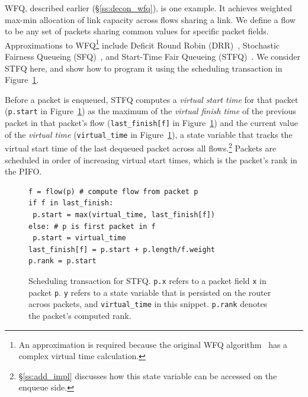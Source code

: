 WFQ, described earlier (\S\ref{ss:decon_wfq}), is one example. It achieves
weighted max-min allocation of link capacity across flows sharing a link. We
define a flow to be any set of packets sharing common values for specific
packet fields.  Approximations to WFQ\footnote{An approximation is required
because the original WFQ algorithm~\cite{wfq} has a complex virtual time
calculation.} include Deficit Round Robin (DRR)~\cite{drr}, Stochastic Fairness
Queueing (SFQ)~\cite{sfq}, and Start-Time Fair Queueing (STFQ)~\cite{stfq}. We
consider STFQ here, and show how to program it using the scheduling transaction
in Figure~\ref{fig:sched_trans}.

Before a packet is enqueued, STFQ computes a {\em virtual start time} for that
packet (\texttt{p.start} in Figure~\ref{fig:sched_trans}) as the maximum of the
{\em virtual finish time} of the previous packet in that packet's flow
(\texttt{last\_finish[f]} in Figure~\ref{fig:sched_trans}) and the current
value of the {\em virtual time} (\texttt{virtual\_time} in
Figure~\ref{fig:sched_trans}), a state variable that tracks the virtual start
time of the last dequeued packet across all flows.\footnote{\S\ref{ss:add_impl}
discusses how this state variable can be accessed on the enqueue side.} Packets
are scheduled in order of increasing virtual start times, which is the packet's
rank in the PIFO.

\begin{figure}[!t]
\begin{lstlisting}[style=customc]
f = flow(p) # compute flow from packet p
if f in last_finish:
 p.start = max(virtual_time, last_finish[f])
else: # p is first packet in f
 p.start = virtual_time
last_finish[f] = p.start + p.length/f.weight
p.rank = p.start
\end{lstlisting}
\caption{Scheduling transaction for STFQ. {\tt p.x} refers to a packet
  field {\tt x} in packet {\tt p}.  {\tt y} refers to a state variable
  that is persisted on the router across packets, 
  and {\tt virtual\_time} in this snippet. {\tt p.rank} denotes the
  packet's computed rank.}
\label{fig:sched_trans}
\end{figure}

